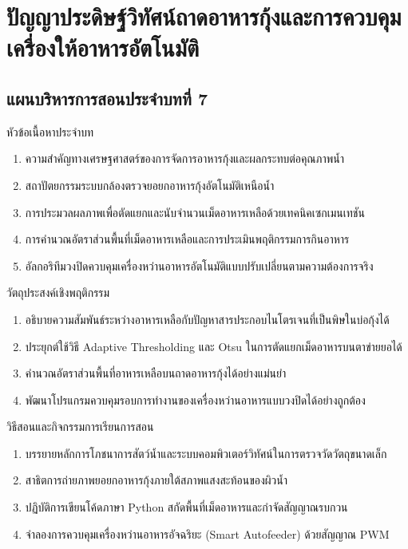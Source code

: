 \chapter{ปัญญาประดิษฐ์วิทัศน์ถาดอาหารกุ้งและการควบคุมเครื่องให้อาหารอัตโนมัติ}
\label{chap:ch07}

\section*{แผนบริหารการสอนประจำบทที่ 7}

\begin{planbox}{หัวข้อเนื้อหาประจำบท}
\begin{enumerate}[topsep=2pt, itemsep=1pt, partopsep=0pt, parsep=0pt, leftmargin=1.5em]
    \item ความสำคัญทางเศรษฐศาสตร์ของการจัดการอาหารกุ้งและผลกระทบต่อคุณภาพน้ำ
    \item สถาปัตยกรรมระบบกล้องตรวจยอยกอาหารกุ้งอัตโนมัติเหนือน้ำ
    \item การประมวลผลภาพเพื่อตัดแยกและนับจำนวนเม็ดอาหารเหลือด้วยเทคนิคเซกเมนเทชัน
    \item การคำนวณอัตราส่วนพื้นที่เม็ดอาหารเหลือและการประเมินพฤติกรรมการกินอาหาร
    \item อัลกอริทึมวงปิดควบคุมเครื่องหว่านอาหารอัตโนมัติแบบปรับเปลี่ยนตามความต้องการจริง
\end{enumerate}
\end{planbox}

\begin{planbox}{วัตถุประสงค์เชิงพฤติกรรม}
\begin{enumerate}[topsep=2pt, itemsep=1pt, partopsep=0pt, parsep=0pt, leftmargin=1.5em]
    \item อธิบายความสัมพันธ์ระหว่างอาหารเหลือกับปัญหาสารประกอบไนโตรเจนที่เป็นพิษในบ่อกุ้งได้
    \item ประยุกต์ใช้วิธี Adaptive Thresholding และ Otsu ในการตัดแยกเม็ดอาหารบนตาข่ายยอได้
    \item คำนวณอัตราส่วนพื้นที่อาหารเหลือบนถาดอาหารกุ้งได้อย่างแม่นยำ
    \item พัฒนาโปรแกรมควบคุมรอบการทำงานของเครื่องหว่านอาหารแบบวงปิดได้อย่างถูกต้อง
\end{enumerate}
\end{planbox}

\newpage

\begin{planbox}{วิธีสอนและกิจกรรมการเรียนการสอน}
\begin{enumerate}[topsep=2pt, itemsep=1pt, partopsep=0pt, parsep=0pt, leftmargin=1.5em]
    \item บรรยายหลักการโภชนาการสัตว์น้ำและระบบคอมพิวเตอร์วิทัศน์ในการตรวจวัดวัตถุขนาดเล็ก
    \item สาธิตการถ่ายภาพยอยกอาหารกุ้งภายใต้สภาพแสงสะท้อนของผิวน้ำ
    \item ปฏิบัติการเขียนโค้ดภาษา Python สกัดพื้นที่เม็ดอาหารและกำจัดสัญญาณรบกวน
    \item จำลองการควบคุมเครื่องหว่านอาหารอัจฉริยะ (Smart Autofeeder) ด้วยสัญญาณ PWM
\end{enumerate}
\end{planbox}

